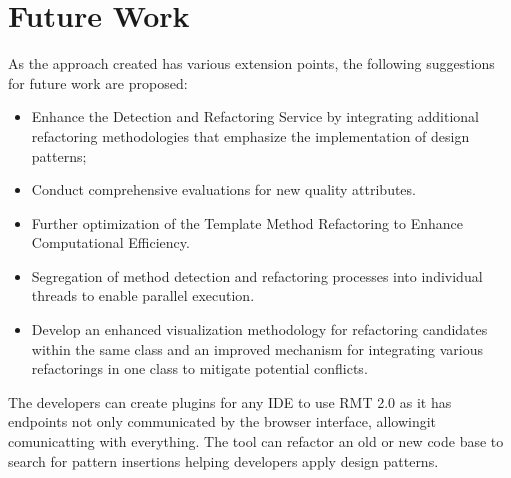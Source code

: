 \section{Future Work}

As the approach created has various extension points, the following suggestions for future work are proposed:
\begin{itemize}
  \item Enhance the Detection and Refactoring Service by integrating additional refactoring methodologies that emphasize the implementation of design patterns; 
    \item Conduct comprehensive evaluations for new quality attributes.
  \item Further optimization of the Template Method Refactoring to Enhance Computational Efficiency. 
  \item Segregation of method detection and refactoring processes into individual threads to enable parallel execution.
  \item Develop an enhanced visualization methodology for refactoring candidates within the same class and an improved mechanism for integrating various refactorings in one class to mitigate potential conflicts.
\end{itemize}

The developers can create plugins for any IDE to use RMT 2.0 as it has endpoints not only communicated by the browser interface, allowingit comunicatting with everything. The tool can refactor an old or new code base to search for pattern insertions helping developers apply design patterns.